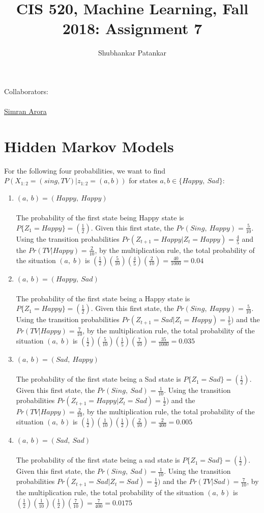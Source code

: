 \documentclass[english]{article}
\title{CIS 520, Machine Learning, Fall 2018: Assignment 7}
\author{Shubhankar Patankar}
\begin{document}
\maketitle

{\normalsize \noindent Collaborators: \\ 
\\ \underline{Simran Arora}} \\

\section{Hidden Markov Models}
For the following four probabilities, we want to find $P(X_{1:2} = (sing, TV) | z_{1:2} = (a,b))$ for states $a, b \in \{Happy, \: Sad\}:$
\begin{enumerate}
    \item $(a, \: b) = (Happy,\: Happy)$ \\ \\ 
    	The probability of the first state being Happy state is $P\{Z_1 = Happy\} = (\frac{1}{2})$. Given this first state, the $Pr(Sing, \: Happy) = \frac{5}{10}$. Using the transition probabilities $Pr(Z_{t+1} = Happy | Z_{t} = Happy) = \frac{4}{5}$ and the $Pr(TV | Happy) = \frac{2}{10}$, by the multiplication rule, the total probability of the situation $(a, \; b)$ is $(\frac{1}{2})(\frac{5}{10})(\frac{4}{5})(\frac{2}{10}) = \frac{40}{1000} = 0.04$
    \item $(a, \: b) = (Happy,\: Sad)$ \\ \\
    	The probability of the first state being a Happy state is $P\{Z_1 = Happy\} = (\frac{1}{2})$. Given this first state, the $Pr(Sing, \: Happy) = \frac{5}{10}$. Using the transition probabilities $Pr(Z_{t+1} = Sad | Z_{t} = Happy) = \frac{1}{5})$ and the $Pr(TV | Happy) = \frac{7}{10}$, by the multiplication rule, the total probability of the situation $(a, \; b)$ is $(\frac{1}{2})(\frac{5}{10})(\frac{1}{5})(\frac{7}{10}) = \frac{35}{1000} = 0.035$
    \item $(a, \: b) = (Sad,\: Happy)$ \\ \\
    	The probability of the first state being a Sad state is $P\{Z_1 = Sad\} = (\frac{1}{2})$. Given this first state, the $Pr(Sing, \: Sad) = \frac{1}{10}$. Using the transition probabilities $Pr(Z_{t+1} = Happy | Z_{t} = Sad) = \frac{1}{2})$ and the $Pr(TV | Happy) = \frac{2}{10}$, by the multiplication rule, the total probability of the situation $(a, \; b)$ is $(\frac{1}{2})(\frac{1}{10})(\frac{1}{2})(\frac{2}{10}) = \frac{2}{400} = 0.005$
    \item $(a, \: b) = (Sad,\: Sad)$ \\ \\
    	The probability of the first state being a sad state is $P\{Z_1 = Sad\} = (\frac{1}{2})$. Given this first state, the $Pr(Sing, \: Sad) = \frac{1}{10}$. Using the transition probabilities $Pr(Z_{t+1} = Sad | Z_{t} = Sad) = \frac{1}{2})$ and the $Pr(TV | Sad) = \frac{7}{10}$, by the multiplication rule, the total probability of the situation $(a, \; b)$ is $(\frac{1}{2})(\frac{1}{10})(\frac{1}{2})(\frac{7}{10}) = \frac{7}{400} = 0.0175$
\end{enumerate}
\end{document}
